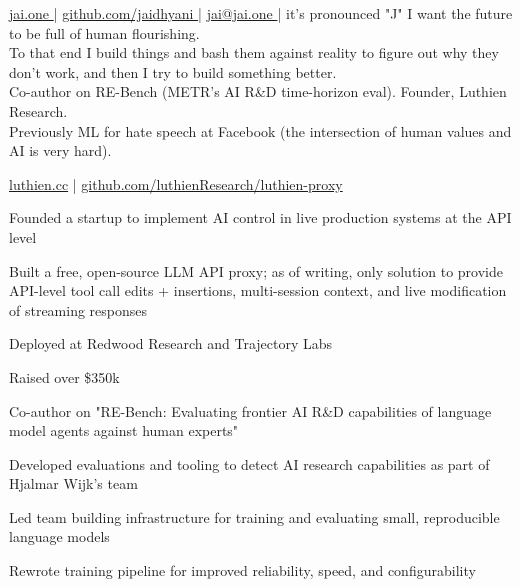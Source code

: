 \documentclass[]{resume}
\begin{document}
\lastupdated
\github

{
    \href{http://jai.one }{jai.one }|
    \href{http://github.com/jaidhyani}{ github.com/jaidhyani }|
    \href{mailto:jai@jai.one}{ jai@jai.one }|
    it's pronounced "J"
}
{
    I want the future to be full of human flourishing.\\
    To that end I build things and bash them against reality to figure out why they don't work, and then I try to build something better.\\
    Co-author on RE-Bench (METR's AI R\&D time-horizon eval). Founder, Luthien Research.\\
    Previously ML for hate speech at Facebook (the intersection of human values and AI is very hard).
}

 \href{https://luthien.cc}{luthien.cc} | \href{https://github.com/luthienResearch/luthien-proxy}{github.com/luthienResearch/luthien-proxy}
\begin{tightemize}
    \item Founded a startup to implement AI control in live production systems at the API level
    \item Built a free, open-source LLM API proxy; as of writing, only solution to provide API-level tool call edits + insertions, multi-session context, and live modification of streaming responses
    \item Deployed at Redwood Research and Trajectory Labs
    \item Raised over \$350k
\end{tightemize}
\sectionsep

\begin{tightemize}
    \item Co-author on "RE-Bench: Evaluating frontier AI R\&D capabilities of language model agents against human experts"
    \item Developed evaluations and tooling to detect AI research capabilities as part of Hjalmar Wijk's team
\end{tightemize}
\sectionsep

\descript{}
\begin{tightemize}
    \item Led team building infrastructure for training and evaluating small, reproducible language models
    \item Rewrote training pipeline for improved reliability, speed, and configurability
\end{tightemize}
\sectionsep
\end{document}
